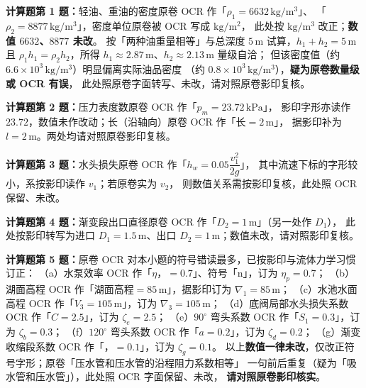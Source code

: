 \begin{tishi}
\textbf{计算题第 1 题：}轻油、重油的密度原卷 OCR 作「$\rho_1=6632\,\mathrm{kg/m^3}$」、
「$\rho_2=8877\,\mathrm{kg/m^3}$」，密度单位原卷被 OCR 写成 $\mathrm{kg/m^2}$，
此处按 $\mathrm{kg/m^3}$ 改正；\textbf{数值 $6632$、$8877$ 未改}。
按「两种油重量相等」与总深度 $5\,\mathrm{m}$ 试算，$h_1+h_2=5\,\mathrm{m}$ 且
$\rho_1h_1=\rho_2h_2$，所得 $h_1\approx2.87\,\mathrm{m}$、$h_2\approx2.13\,\mathrm{m}$ 量级自洽；
但该密度值（约 $6.6\times10^3\,\mathrm{kg/m^3}$）明显偏离实际油品密度
（约 $0.8\times10^3\,\mathrm{kg/m^3}$），\textbf{疑为原卷数量级或 OCR 有误}，
此处照原卷字面转写、未改，请对照原卷影印复核。

\textbf{计算题第 2 题：}压力表度数原卷 OCR 作「$p_m=23.72\,\mathrm{kPa}$」，
影印字形亦读作 $23.72$，数值未作改动；长（沿轴向）原卷 OCR 作「长$=2\,\mathrm{m}$」，
据影印补为 $l=2\,\mathrm{m}$。两处均请对照原卷影印复核。

\textbf{计算题第 3 题：}水头损失原卷 OCR 作「$h_w=0.05\dfrac{v_1^{2}}{2g}$」，
其中流速下标的字形较小，系按影印读作 $v_1$；若原卷实为 $v_2$，
则数值关系需按影印复核，此处照 OCR 保留、未改。

\textbf{计算题第 4 题：}渐变段出口直径原卷 OCR 作「$D_2=1\,\mathrm{m}$」（另一处作 $D_1$），
此处按影印转写为进口 $D_1=1.5\,\mathrm{m}$、出口 $D_2=1\,\mathrm{m}$；数值未改，请对照影印复核。

\textbf{计算题第 5 题：}原卷 OCR 对本小题的符号错读最多，已按影印与流体力学习惯订正：
（a）水泵效率 OCR 作「$\eta$，$=0.7$」、符号「n」，订为 $\eta_p=0.7$；
（b）湖面高程 OCR 作「湖面高程$=85\,\mathrm{m}$」，据影印订为 $\nabla_1=85\,\mathrm{m}$；
（c）水池水面高程 OCR 作「$V_3=105\,\mathrm{m}$」，订为 $\nabla_3=105\,\mathrm{m}$；
（d）底阀局部水头损失系数 OCR 作「$C=2.5$」，订为 $\zeta_e=2.5$；
（e）$90^\circ$ 弯头系数 OCR 作「$S_1=0.3$」，订为 $\zeta_b=0.3$；
（f）$120^\circ$ 弯头系数 OCR 作「$a=0.2$」，订为 $\zeta_d=0.2$；
（g）渐变收缩段系数 OCR 作「，$=0.1$」，订为 $\zeta_g=0.1$。
以上\textbf{数值一律未改}，仅改正符号字形；原卷「压水管和压水管的沿程阻力系数相等」
一句前后重复（疑为「吸水管和压水管」），此处照 OCR 字面保留、未改，
\textbf{请对照原卷影印核实}。
\end{tishi}
